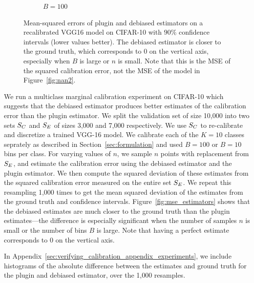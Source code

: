 \begin{figure}
\begin{subfigure}[b]{0.45\textwidth}
         \caption{$B = 100$
         }
         \label{fig:ce_vs_bins_verifying}
     \end{subfigure}
  \caption{
    Mean-squared errors of plugin and debiased estimators on a recalibrated VGG16 model on CIFAR-10 with $90\%$ confidence intervals (lower values better). The debiased estimator is closer to the ground truth, which corresponds to $0$ on the vertical axis, especially when $B$ is large or $n$ is small.
    Note that this is the MSE of the squared calibration error, not the MSE of the model in Figure~\ref{fig:nan2}.
}
  \label{fig:mse_estimators_bins}
\end{figure}

We run a multiclass marginal calibration experiment on CIFAR-10 which suggests that the debiased estimator produces better estimates of the calibration error than the plugin estimator. We split the validation set of size 10,000 into two sets $S_C{}$ and $S_E{}$ of sizes 3,000 and 7,000 respectively. We use $S_C{}$ to re-calibrate and discretize a trained VGG-16 model. We calibrate each of the $K = 10$ classes seprately as described in Section~\ref{sec:formulation} and used $B = 100$ or $B = 10$ bins per class. For varying values of $n$, we sample $n$ points with replacement from $S_E{}$, and estimate the calibration error using the debiased estimator and the plugin estimator. We then compute the squared deviation of these estimates from the squared calibration error measured on the entire set $S_E{}$. We repeat this resampling 1,000 times to get the mean squared deviation of the estimates from the ground truth and confidence intervals. Figure~\ref{fig:mse_estimators} shows that the debiased estimates are much closer to the ground truth than the plugin estimates---the difference is especially significant when the number of samples $n$ is small or the number of bins $B$ is large. Note that having a perfect estimate corresponds to $0$ on the vertical axis.

In Appendix~\ref{sec:verifying_calibration_appendix_experiments}, we include histograms of the absolute difference between the estimates and ground truth for the plugin and debiased estimator, over the 1,000 resamples.

